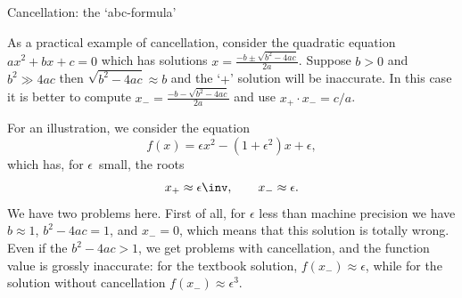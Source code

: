  {Cancellation: the `abc-formula'}
\label{sec:abc-formula}

As a practical example of cancellation,
consider the quadratic equation $ax^2+bx+c=0$ 
which has solutions $x=\frac{-b\pm\sqrt{b^2-4ac}}{2a}$.
Suppose $b>0$ and $b^2\gg 4ac$ then $\sqrt{b^2-4ac}\approx b$ and
the `$+$' solution will be
inaccurate. In this case it is better 
to compute $x_-=\frac{-b-\sqrt{b^2-4ac}}{2a}$ and use $x_+\cdot x_-=c/a$.

For an illustration, we consider the equation
\[ f(x) = \epsilon x^2 -(1+\epsilon^2) x + \epsilon, \]
which has, for $\epsilon$~small, the roots
\[ x_+\approx \epsilon\inv,\qquad x_-\approx \epsilon. \]
We have two problems here.
First of all, for $\epsilon$ less than machine precision
we have $b\approx 1$, $b^2-4ac=1$, and $x_-=0$,
which means that this solution is totally wrong.
Even if the  $b^2-4ac>1$,
we get problems with cancellation,
and the function value is grossly inaccurate:
for the textbook solution, $f(x_-)\approx\epsilon$,
while for the solution without cancellation $f(x_-)\approx \epsilon^3$.

